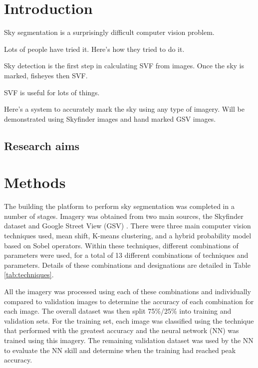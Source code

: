 \documentclass[final,3p,times,authoryear]{elsarticle}
\begin{document}
\section{Introduction}\label{sec:introduction}

Sky segmentation is a surprisingly difficult computer vision problem. 

Lots of people have tried it. Here's how they tried to do it.

Sky detection is the first step in calculating SVF from images. Once the sky is marked, fisheyes then SVF.

SVF is useful for lots of things.

Here's a system to accurately mark the sky using any type of imagery. Will be demonstrated using Skyfinder images and hand marked GSV images.


\subsection{Research aims}





\section{Methods}\label{sec:Methods}

The building the platform to perform sky segmentation was completed in a number of stages. Imagery was obtained from two main sources, the Skyfinder dataset \citep{Mihail2016} and Google Street View (GSV) \citep{GoogleMaps2017b}. There were three main computer vision techniques used, mean shift, K-means clustering, and a hybrid probability model based on Sobel operators. Within these techniques, different combinations of parameters were used, for a total of 13 different combinations of techniques and parameters. Details of these combinations and designations are detailed in Table \ref{tab:techniques}.

All the imagery was processed using each of these combinations and individually compared to validation images to determine the accuracy of each combination for each image. The overall dataset was then split 75\%/25\% into training and validation sets. For the training set, each image was classified using the technique that performed with the greatest accuracy and the neural network (NN) was trained using this imagery. The remaining validation dataset was used by the NN to evaluate the NN skill and determine when the training had reached peak accuracy.
\end{document}
